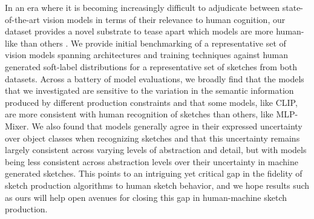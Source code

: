 \documentclass[10pt,letterpaper]{article}
\begin{document}
In an era where it is becoming increasingly difficult to adjudicate between state-of-the-art vision models in terms of their relevance to human cognition, our dataset provides a novel substrate to tease apart which models are more human-like than others \cite{golan2020controversial}.
We provide initial benchmarking of a representative set of vision models spanning architectures and training techniques against human generated soft-label distributions for a representative set of sketches from both datasets. 
Across a battery of model evaluations, we broadly find that the models that we investigated are sensitive to the variation in the semantic information produced by different production constraints and that some models, like CLIP, are more consistent with human recognition of sketches than others, like MLP-Mixer. 
We also found that models generally agree in their expressed uncertainty over object classes when recognizing sketches and that this uncertainty remains largely consistent across varying levels of abstraction and detail, but with models being less consistent across abstraction levels over their uncertainty in machine generated sketches.
This points to an intriguing yet critical gap in the fidelity of sketch production algorithms to human sketch behavior, and we hope results such as ours will help open avenues for closing this gap in human-machine sketch production.


\end{document}

